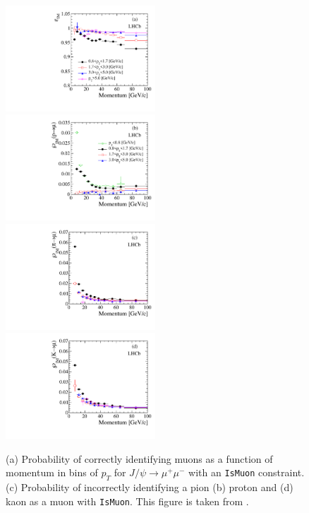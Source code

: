 \begin{figure}[!h]
	\includegraphics[width = 0.5\textwidth]{figs/detector/dllFit_mu_IMvsPvsPt.pdf}%
	\includegraphics[width = 0.5\textwidth]{figs/detector/dllFit_P_IMvsPvsPt.pdf}%
       \newline
	\includegraphics[width = 0.5\textwidth]{figs/detector/dllFit_pi_IMvsPvsPt.pdf}%
	\includegraphics[width = 0.5\textwidth]{figs/detector/dllFit_ka_IMvsPvsPt.pdf}%
	\caption{(a) Probability of correctly identifying muons as a function of momentum in bins of $p_{T}$ for $J/\psi \rightarrow \mu^{+} \mu^{-}$ with an \texttt{IsMuon} constraint. (c) Probability of incorrectly identifying a pion (b) proton and (d) kaon as a muon with \texttt{IsMuon}. This figure is taken from \cite{LHCb-DP-2013-001}. }  
	\label{fig:MuonID}
\end{figure}


